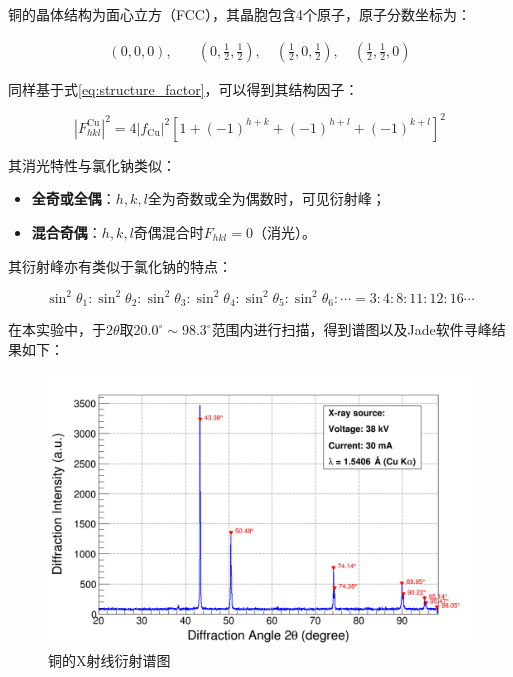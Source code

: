 \documentclass{thuemp}
\begin{document}
铜的晶体结构为面心立方（FCC），其晶胞包含4个原子，原子分数坐标为：

\begin{align*}
(0,0,0),\quad &\left(0,\frac{1}{2},\frac{1}{2}\right),\quad \left(\frac{1}{2},0,\frac{1}{2}\right),\quad \left(\frac{1}{2},\frac{1}{2},0\right)
\end{align*}

同样基于式\ref{eq:structure_factor}，可以得到其结构因子：

\begin{equation}
    |F_{hkl}^{\text{Cu}}|^2 = 4|f_{\text{Cu}}|^2\left[1 + (-1)^{h+k} + (-1)^{h+l} + (-1)^{k+l}\right]^2
    \label{eq:cu_struct_fac}
\end{equation}

其消光特性与氯化钠类似：

\begin{itemize}
    \item \textbf{全奇或全偶}：$h,k,l$全为奇数或全为偶数时，可见衍射峰；
    \item \textbf{混合奇偶}：$h,k,l$奇偶混合时$F_{hkl}=0$（消光）。
\end{itemize}

其衍射峰亦有类似于氯化钠的特点：

\begin{equation}
    \sin^2\theta_1 : \sin^2\theta_2: \sin^2\theta_3 : \sin^2\theta_4 : \sin^2\theta_5 : \sin^2\theta_6 : \cdots =
    3 : 4 : 8 : 11 : 12: 16 \cdots
    \label{eq:cu_diff_patt}
\end{equation}

在本实验中，于$2\theta$取$20.0^\circ \sim 98.3^\circ$范围内进行扫描，得到谱图以及Jade软件寻峰结果如下：

\begin{figure}[H]
    \centering
    \includegraphics[width=0.8\linewidth]{../Data/Cu-multi.png}
    \caption{铜的X射线衍射谱图}
    \label{fig:cu_xrd}
\end{figure}
\end{document}
